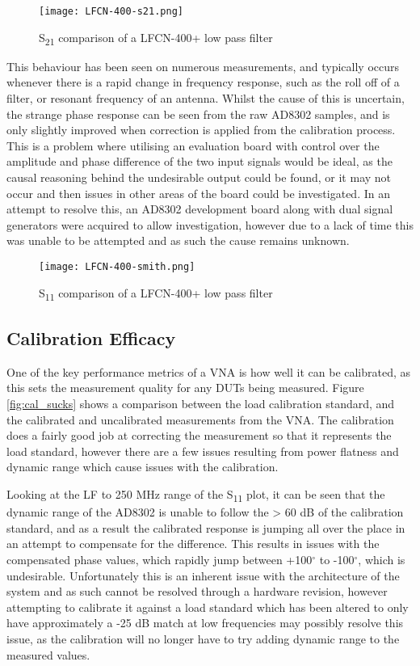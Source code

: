 \begin{figure}[H]
	\centering
	\texttt{[image: LFCN-400-s21.png]}
	\caption{S\textsubscript{21} comparison of a LFCN-400+ low pass filter}
	\label{fig:compare_lfcn_s21}
\end{figure}

This behaviour has been seen on numerous measurements, and typically occurs whenever there is a rapid change in frequency response, such as the roll off of a filter, or resonant frequency of an antenna. Whilst the cause of this is uncertain, the strange phase response can be seen from the raw AD8302 samples, and is only slightly improved when correction is applied from the calibration process. This is a problem where utilising an evaluation board with control over the amplitude and phase difference of the two input signals would be ideal, as the causal reasoning behind the undesirable output could be found, or it may not occur and then issues in other areas of the board could be investigated. In an attempt to resolve this, an AD8302 development board along with dual signal generators were acquired to allow investigation, however due to a lack of time this was unable to be attempted and as such the cause remains unknown. 

\begin{figure}[H]
	\centering
	\texttt{[image: LFCN-400-smith.png]}
	\caption{S\textsubscript{11} comparison of a LFCN-400+ low pass filter}
	\label{fig:compare_lfcn_smith}
\end{figure}

\subsection{Calibration Efficacy}
One of the key performance metrics of a VNA is how well it can be calibrated, as this sets the measurement quality for any DUTs being measured. Figure \ref{fig:cal_sucks} shows a comparison between the load calibration standard, and the calibrated and uncalibrated measurements from the VNA. The calibration does a fairly good job at correcting the measurement so that it represents the load standard, however there are a few issues resulting from power flatness and dynamic range which cause issues with the calibration. 

Looking at the LF to 250 MHz range of the S\textsubscript{11} plot, it can be seen that the dynamic range of the AD8302 is unable to follow the > 60 dB of the calibration standard, and as a result the calibrated response is jumping all over the place in an attempt to compensate for the difference. This results in issues with the compensated phase values, which rapidly jump between +100$^\circ$ to -100$^\circ$, which is undesirable. Unfortunately this is an inherent issue with the architecture of the system and as such cannot be resolved through a hardware revision, however attempting to calibrate it against a load standard which has been altered to only have approximately a -25 dB match at low frequencies may possibly resolve this issue, as the calibration will no longer have to try adding dynamic range to the measured values. 

